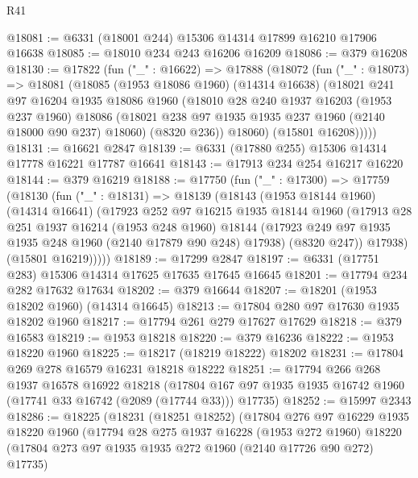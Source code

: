 \begin{lexlean}{R41}
\begin{coremodule}
@18081 := @6331 (@18001 @244) @15306 @14314 @17899 @16210 @17906 @16638
@18085 := @18010 @234 @243 @16206 @16209
@18086 := @379 @16208
@18130 := @17822
    (fun ("_" : @16622) =>
    @17888
      (@18072
        (fun ("_" : @18073) =>
        @18081
          (@18085
            (@1953 @18086 @1960)
            (@14314 @16638)
            (@18021
              @241
              @97
              @16204
              @1935
              @18086
              @1960
              (@18010
                @28
                @240
                @1937
                @16203
                (@1953 @237 @1960)
                @18086
                (@18021 @238 @97 @1935 @1935 @237 @1960 (@2140 @18000 @90 @237) @18060)
                (@8320 @236))
              @18060)
            (@15801 @16208)))))
@18131 := @16621 @2847
@18139 := @6331 (@17880 @255) @15306 @14314 @17778 @16221 @17787 @16641
@18143 := @17913 @234 @254 @16217 @16220
@18144 := @379 @16219
@18188 := @17750
    (fun ("_" : @17300) =>
    @17759
      (@18130
        (fun ("_" : @18131) =>
        @18139
          (@18143
            (@1953 @18144 @1960)
            (@14314 @16641)
            (@17923
              @252
              @97
              @16215
              @1935
              @18144
              @1960
              (@17913
                @28
                @251
                @1937
                @16214
                (@1953 @248 @1960)
                @18144
                (@17923 @249 @97 @1935 @1935 @248 @1960 (@2140 @17879 @90 @248) @17938)
                (@8320 @247))
              @17938)
            (@15801 @16219)))))
@18189 := @17299 @2847
@18197 := @6331 (@17751 @283) @15306 @14314 @17625 @17635 @17645 @16645
@18201 := @17794 @234 @282 @17632 @17634
@18202 := @379 @16644
@18207 := @18201 (@1953 @18202 @1960) (@14314 @16645)
@18213 := @17804 @280 @97 @17630 @1935 @18202 @1960
@18217 := @17794 @261 @279 @17627 @17629
@18218 := @379 @16583
@18219 := @1953 @18218
@18220 := @379 @16236
@18222 := @1953 @18220 @1960
@18225 := @18217 (@18219 @18222) @18202
@18231 := @17804 @269 @278 @16579 @16231 @18218 @18222
@18251 := @17794
    @266
    @268
    @1937
    @16578
    @16922
    @18218
    (@17804 @167 @97 @1935 @1935 @16742 @1960 (@17741 @33 @16742 (@2089 (@17744 @33))) @17735)
@18252 := @15997 @2343
@18286 := @18225
    (@18231
      (@18251 @18252)
      (@17804
        @276
        @97
        @16229
        @1935
        @18220
        @1960
        (@17794
          @28
          @275
          @1937
          @16228
          (@1953 @272 @1960)
          @18220
          (@17804 @273 @97 @1935 @1935 @272 @1960 (@2140 @17726 @90 @272) @17735)

\end{coremodule}
\end{lexlean}
